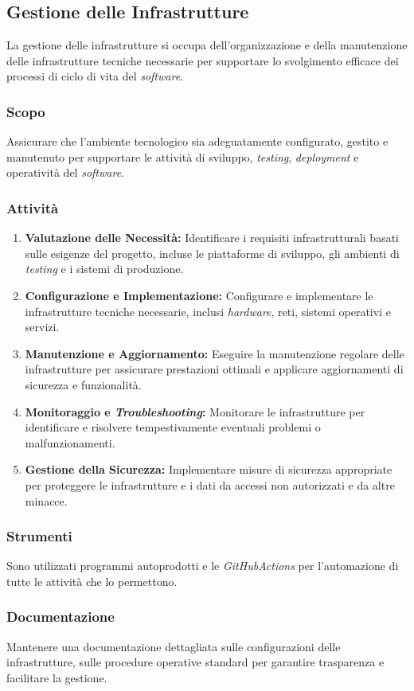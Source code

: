\subsection{Gestione delle Infrastrutture}

La gestione delle infrastrutture si occupa dell'organizzazione e della
manutenzione delle infrastrutture tecniche necessarie per supportare lo
svolgimento efficace dei processi di ciclo di vita del \textit{software}.

\subsubsection{Scopo}
Assicurare che l'ambiente tecnologico sia adeguatamente configurato, gestito e
manutenuto per supportare le attività di sviluppo, \textit{testing},
\textit{deployment} e operatività del \textit{software}.

\subsubsection{Attività}
\begin{enumerate}
	\item \textbf{Valutazione delle Necessità:} Identificare i requisiti
	      infrastrutturali basati sulle esigenze del progetto, incluse le
	      piattaforme di sviluppo, gli ambienti di \textit{testing} e i sistemi
	      di produzione.
	\item \textbf{Configurazione e Implementazione:} Configurare e implementare
	      le infrastrutture tecniche necessarie, inclusi \textit{hardware},
	      reti, sistemi operativi e servizi.
	\item \textbf{Manutenzione e Aggiornamento:} Eseguire la manutenzione
	      regolare delle infrastrutture per assicurare prestazioni ottimali e
	      applicare aggiornamenti di sicurezza e funzionalità.
	\item \textbf{Monitoraggio e \textit{Troubleshooting}:} Monitorare le
	      infrastrutture per identificare e risolvere tempestivamente eventuali
	      problemi o malfunzionamenti.
	\item \textbf{Gestione della Sicurezza:} Implementare misure di sicurezza
	      appropriate per proteggere le infrastrutture e i dati da accessi non
	      autorizzati e da altre minacce.
\end{enumerate}

\subsubsection{Strumenti}
Sono utilizzati programmi autoprodotti e le \textit{GitHub\g Actions} per
l'automazione di tutte le attività che lo permettono.

\subsubsection{Documentazione}
Mantenere una documentazione dettagliata sulle configurazioni delle
infrastrutture, sulle procedure operative standard per garantire trasparenza e
facilitare la gestione.
